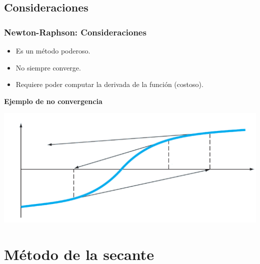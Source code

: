 \documentclass[xcolor=svgnames]{beamer} %
\theoremstyle{plain}
\renewcommand{\textbf}[1]{{\bfseries\textcolor{redUnq2}{#1}}}
\theoremstyle{definition}
\begin{document}
\subsection{Consideraciones}
\begin{frame}
\frametitle{Newton-Raphson: Consideraciones}
\begin{minipage}{.45\linewidth}
\begin{itemize}
\item Es un método poderoso.
\item No siempre converge.
\item Requiere poder computar la derivada de la función (costoso).
\end{itemize}

\end{minipage} \begin{minipage}{.45\linewidth}
\textbf{Ejemplo de no convergencia}

\includegraphics[width=\linewidth]{NewthonRaphson/divergencia.PNG} 
\end{minipage}
\end{frame}


\section{Método de la secante}
\end{document}
